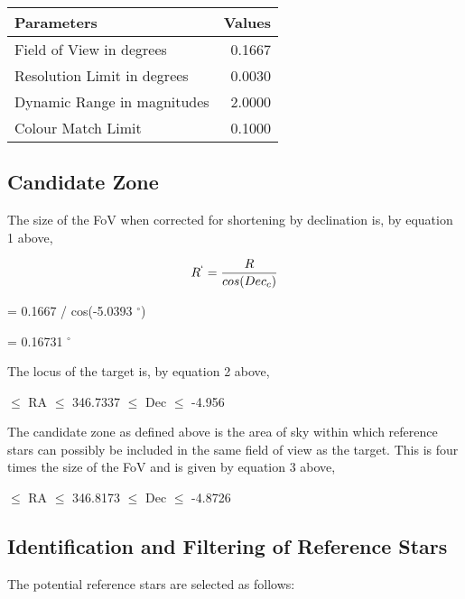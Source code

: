 \documentclass[]{elsarticle} %
\begin{document}
\begin{table}[H]
\centering
\begin{tabular}{l|r}
\hline
Parameters & Values\\
\hline
Field of View in degrees & 0.1667\\
\hline
Resolution Limit in degrees & 0.0030\\
\hline
Dynamic Range in magnitudes & 2.0000\\
\hline
Colour Match Limit & 0.1000\\
\hline
\end{tabular}
\end{table}

\hypertarget{candidate-zone-1}{%
\subsection{Candidate Zone}\label{candidate-zone-1}}

The size of the FoV when corrected for shortening by declination is, by
equation 1 above,

\[R^` = {\frac{R}{cos(Dec_c)}}\]

\center = 0.1667 / cos(-5.0393 \(^{\circ}\)) \center

\center = 0.16731 \(^{\circ}\) \center

The locus of the target is, by equation 2 above,

 \(\leq\) RA \(\leq\) 346.7337 \center {}
\(\leq\) Dec \(\leq\) -4.956 \center

The candidate zone as defined above is the area of sky within which
reference stars can possibly be included in the same field of view as
the target. This is four times the size of the FoV and is given by
equation 3 above,

 \(\leq\) RA \(\leq\) 346.8173 \center {}
\(\leq\) Dec \(\leq\) -4.8726 \center

\newpage

\hypertarget{identification-and-filtering-of-reference-stars-1}{%
\subsection{Identification and Filtering of Reference
Stars}\label{identification-and-filtering-of-reference-stars-1}}

The potential reference stars are selected as follows:
\end{document}
